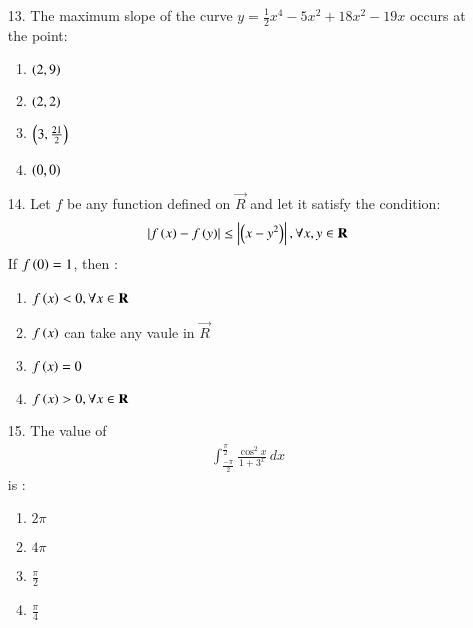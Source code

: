 \documentclass[journal,12pt,onecolumn]{IEEEtran}
\theoremstyle{remark}
\begin{document}
\begin{enumerate}
\begin{figure}
		\end{figure}
	\item[13.] The maximum slope of the curve $y = \frac{1}{2}x^4 -5x^2 + 18x^2 -19x$ occurs at the point:
	\begin{multicols}{4}
		\begin{enumerate}
			\item $\left(2, 9\right)$ \columnbreak
			\item $\left(2, 2\right)$ \columnbreak
			\item $\left(3, \frac{21}{2}\right)$ \columnbreak
			\item $\left(0, 0\right)$
		\end{enumerate}
	\end{multicols}
\item[14.] Let $f$ be any function defined on $\vec{R}$ and let it satisfy the condition: 
	\begin{align}
		\left\vert f\left(x\right) - f\left(y\right)\right\vert \le \left\vert\left(x - y^2\right)\right\vert, \forall x, y \in \mathbf{R}
	\end{align} 
		If $f\left(0\right) = 1$, then :
		\begin{enumerate}
			\item $f\left(x\right) < 0, \forall x \in \mathbf{R}$
			\item $f\left(x\right)$ can take any vaule in $\vec{R}$
			\item $f\left(x\right) = 0$
			\item $f\left(x\right) > 0, \forall x \in \mathbf{R}$
		\end{enumerate}
\item[15.] The value of
		\begin{align*}
			\int_{\frac{-\pi}{2}} ^ {\frac{\pi}{2}} \frac{\cos ^2 x}{1 + 3^x} \, dx
		\end{align*} is :
	\begin{multicols}{4}
		\begin{enumerate}
			\item $2\pi$ \columnbreak
			\item $4\pi$ \columnbreak
			\item $\frac{\pi}{2}$ \columnbreak
			\item $\frac{\pi}{4}$
		\end{enumerate}
	\end{multicols}
	\end{enumerate}
\end{document}

